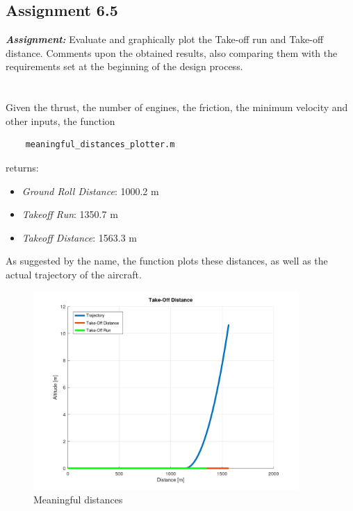 \documentclass{article}
\begin{document}
\subsection{Assignment 6.5\label{Assignment_6.5}}

\textbf{\textit{Assignment:}} Evaluate and graphically plot the Take-off run and Take-off distance.
Comments upon the obtained results, also comparing them 
with the requirements set at the beginning of the design process. \\ \\ \\ 

Given the thrust, the number of engines, the friction, the minimum velocity and other inputs, the function \autocite{Airbus_replacement_repo}

\begin{verbatim}
    meaningful_distances_plotter.m
\end{verbatim}

returns:

\begin{itemize}
    \item \textit{Ground Roll Distance}: 1000.2 m
    \item \textit{Takeoff Run}: 1350.7 m
    \item \textit{Takeoff Distance}: 1563.3 m
\end{itemize}

As suggested by the name, the function plots these distances, as well as the actual trajectory of the aircraft. \\ 

\begin{figure}[h!]
    \centering
    \includegraphics[width=0.9\textwidth]{Sources/Plots_and_Pictures/Distances.png}
    \caption{Meaningful distances}
    \label{distances}
\end{figure}
\end{document}
